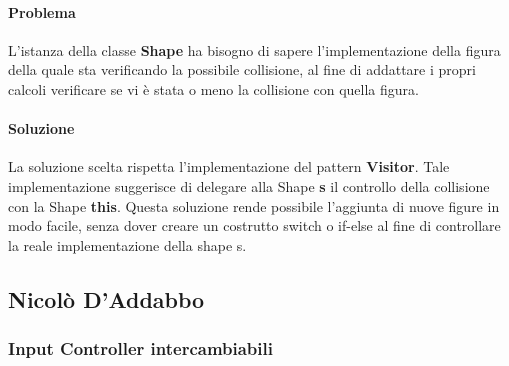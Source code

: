 \documentclass[a4paper,12pt]{report}
\begin{document}
\paragraph*{Problema} L'istanza della classe \textbf{Shape} ha bisogno di sapere l'implementazione della figura della quale sta verificando la possibile collisione, al fine di addattare i propri calcoli verificare se vi è stata o meno la collisione con quella figura. 
%
\paragraph*{Soluzione} La soluzione scelta rispetta l'implementazione del pattern \textbf{Visitor}.
Tale implementazione suggerisce di delegare alla Shape \textbf{s} il controllo della collisione con la Shape \textbf{this}.
Questa soluzione rende possibile l'aggiunta di nuove figure in modo facile, senza dover creare un costrutto switch o if-else al fine di controllare la reale implementazione della shape s.

\subsection*{Nicolò D'Addabbo}

\subsubsection{Input Controller intercambiabili}
\end{document}
